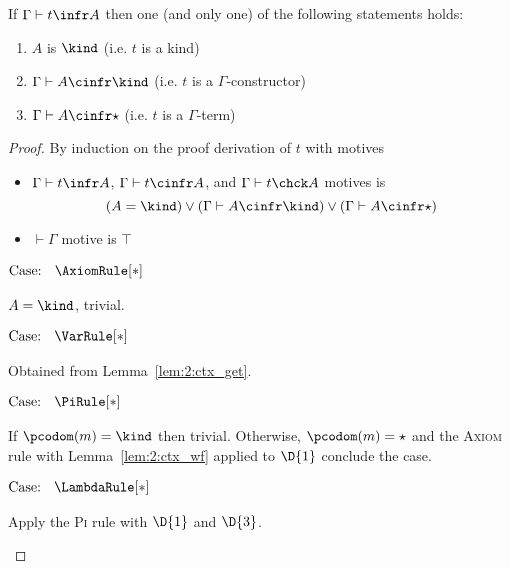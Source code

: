\begin{theorem}[Classification]
    If $\Gamma \vdash t \infr A$ then one (and only one) of the following statements holds:
    \begin{enumerate}
        \item $A$ is $\kind$ (i.e. $t$ is a kind)
        \item $\Gamma \vdash A \cinfr \kind$ (i.e. $t$ is a $\Gamma$-constructor)
        \item $\Gamma \vdash A \cinfr \star$ (i.e. $t$ is a $\Gamma$-term)
    \end{enumerate}
\end{theorem}
\begin{proof}
    By induction on the proof derivation of $t$ with motives
    \begin{itemize}
        \item {
            $\Gamma \vdash t \infr A$, $\Gamma \vdash t \cinfr A$, and $\Gamma \vdash t \chck A$ motives is
            $$(A = \kind) \vee (\Gamma \vdash A \cinfr \kind) \vee (\Gamma \vdash A \cinfr \star)$$
        }
        \item {
            $\vdash \Gamma$ motive is $\top$
        }
    \end{itemize}

    $\text{Case: }\begin{array}{c} \AxiomRule[*] \end{array}$
    \begin{proofcase}
        $A = \kind$, trivial.
    \end{proofcase}

    $\text{Case: }\begin{array}{c} \VarRule[*] \end{array}$
    \begin{proofcase}
        Obtained from Lemma~\ref{lem:2:ctx_get}.
    \end{proofcase}

    $\text{Case: }\begin{array}{c} \PiRule[*] \end{array}$
    \begin{proofcase}
        If $\pcodom(m) = \kind$ then trivial.
        Otherwise, $\pcodom(m) = \star$ and the \textsc{Axiom} rule with Lemma~\ref{lem:2:ctx_wf} applied to $\D{1}$ conclude the case.
    \end{proofcase}

    $\text{Case: }\begin{array}{c} \LambdaRule[*] \end{array}$
    \begin{proofcase}
        Apply the \textsc{Pi} rule with $\D{1}$ and $\D{3}$.
    \end{proofcase}


\end{proof}
